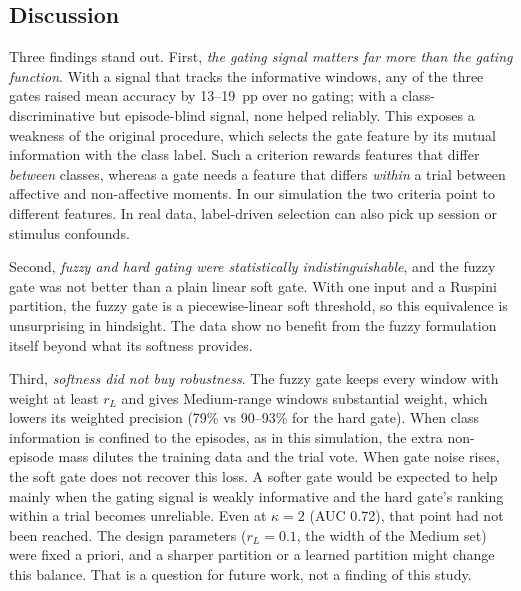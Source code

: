 \documentclass[11pt,a4paper]{article}
\newcommand{\simnote}{\textsuperscript{$\ast$}}
\begin{document}
\begin{table}[t]
\centering\scriptsize
\caption{Earlier baseline (M0) runs on the synthetic data with the original window-level protocol\simnote{} (window accuracy on retained windows, \%, mean $\pm$ SD over 5 folds, 3 fuzzy levels)}\label{tab:prev}
\resizebox{\linewidth}{!}{}
\end{table}

\subsection{Discussion}
Three findings stand out. First, \emph{the gating signal matters far more than the gating function}. With a signal that tracks the informative windows, any of the three gates raised mean accuracy by 13--19~pp over no gating; with a class-discriminative but episode-blind signal, none helped reliably. This exposes a weakness of the original procedure, which selects the gate feature by its mutual information with the class label. Such a criterion rewards features that differ \emph{between} classes, whereas a gate needs a feature that differs \emph{within} a trial between affective and non-affective moments. In our simulation the two criteria point to different features. In real data, label-driven selection can also pick up session or stimulus confounds.

Second, \emph{fuzzy and hard gating were statistically indistinguishable}, and the fuzzy gate was not better than a plain linear soft gate. With one input and a Ruspini partition, the fuzzy gate is a piecewise-linear soft threshold, so this equivalence is unsurprising in hindsight. The data show no benefit from the fuzzy formulation itself beyond what its softness provides.

Third, \emph{softness did not buy robustness}. The fuzzy gate keeps every window with weight at least $r_L$ and gives Medium-range windows substantial weight, which lowers its weighted precision (79\% vs 90--93\% for the hard gate). When class information is confined to the episodes, as in this simulation, the extra non-episode mass dilutes the training data and the trial vote. When gate noise rises, the soft gate does not recover this loss. A softer gate would be expected to help mainly when the gating signal is weakly informative and the hard gate's ranking within a trial becomes unreliable. Even at $\kappa=2$ (AUC 0.72), that point had not been reached. The design parameters ($r_L=0.1$, the width of the Medium set) were fixed a priori, and a sharper partition or a learned partition might change this balance. That is a question for future work, not a finding of this study.
\end{document}
